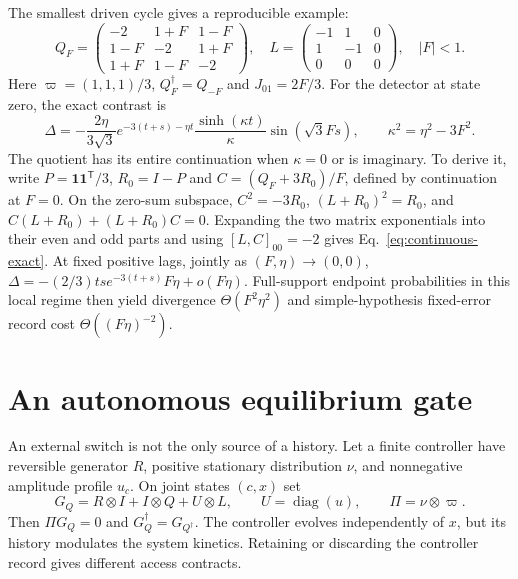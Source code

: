 The smallest driven cycle gives a reproducible example:
\begin{equation}
 Q_F=\begin{pmatrix}-2&1+F&1-F\\1-F&-2&1+F\\1+F&1-F&-2\end{pmatrix},
 \quad L=\begin{pmatrix}-1&1&0\\1&-1&0\\0&0&0\end{pmatrix},
 \quad |F|<1.
 \label{eq:continuous-triangle}
\end{equation}
Here $\varpi=(1,1,1)/3$, $Q_F^\dagger=Q_{-F}$ and $J_{01}=2F/3$.
For the detector at state zero, the exact contrast is
\begin{equation}
 \Delta=-\frac{2\eta}{3\sqrt3}e^{-3(t+s)-\eta t}
    \frac{\sinh(\kappa t)}{\kappa}\sin(\sqrt3Fs),
 \qquad \kappa^2=\eta^2-3F^2.
 \label{eq:continuous-exact}
\end{equation}
The quotient has its entire continuation when $\kappa=0$ or is imaginary.
To derive it, write $P=\mathbf1\mathbf1^{\mathsf T}/3$, $R_0=I-P$ and
$C=(Q_F+3R_0)/F$, defined by continuation at $F=0$.
On the zero-sum subspace, $C^2=-3R_0$, $(L+R_0)^2=R_0$, and
$C(L+R_0)+(L+R_0)C=0$. Expanding the two matrix exponentials into their even
and odd parts and using $[L,C]_{00}=-2$ gives
Eq.~\eqref{eq:continuous-exact}. At fixed positive lags, jointly as
$(F,\eta)\to(0,0)$,
$\Delta=-(2/3)ts e^{-3(t+s)}F\eta+o(F\eta)$.
Full-support endpoint probabilities in this local regime then yield divergence
$\Theta(F^2\eta^2)$ and simple-hypothesis fixed-error record cost
$\Theta((F\eta)^{-2})$.

\section{An autonomous equilibrium gate}

An external switch is not the only source of a history. Let a finite controller
have reversible generator $R$, positive stationary distribution $\nu$, and
nonnegative amplitude profile $u_c$. On joint states $(c,x)$ set
\begin{equation}
 G_Q=R\otimes I+I\otimes Q+U\otimes L,\qquad
 U=\operatorname{diag}(u),\qquad
 \Pi=\nu\otimes\varpi.
 \label{eq:continuous-gate}
\end{equation}
Then $\Pi G_Q=0$ and $G_Q^\dagger=G_{Q^\dagger}$. The controller evolves
independently of $x$, but its history modulates the system kinetics. Retaining
or discarding the controller record gives different access contracts.

